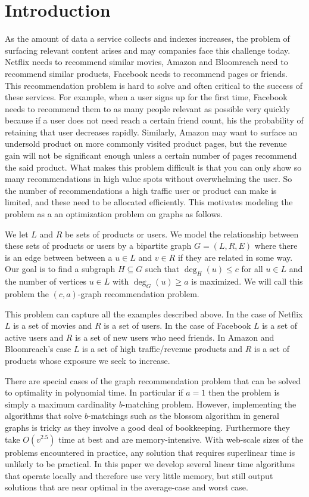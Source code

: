 \section{Introduction}
As the amount of data a service collects and indexes increases, the
problem of surfacing relevant content arises and may companies face
this challenge today. Netflix needs to recommend similar movies,
Amazon and Bloomreach need to recommend similar products, Facebook
needs to recommend pages or friends. This recommendation problem is
hard to solve and often critical to the success of these services. For
example, when a user signs up for the first time, Facebook needs to
recommend them to as many people relevant as possible very quickly
because if a user does not need reach a certain friend count, his the
probability of retaining that user decreases rapidly. Similarly,
Amazon may want to surface an undersold product on more commonly
visited product pages, but the revenue gain will not be significant
enough unless a certain number of pages recommend the said
product. What makes this problem difficult is that you can only show
so many recommendations in high value spots without overwhelming the
user. So the number of recommendations a high traffic user or product
can make is limited, and these need to be allocated efficiently. This
motivates modeling the problem as a an optimization problem on graphs
as follows. \vs

We let $L$ and $R$ be sets of products or users. We model the
relationship between these sets of products or users by a bipartite
graph $G=(L,R,E)$ where there is an edge between between a $u\in L$
and $v\in R$ if they are related in some way. Our goal is to find
a subgraph $H\subseteq G$ such that $\deg_{H}(u) \leq c$ for all $u\in
L$ and the number of vertices $u\in L$ with $\deg_{G}(u) \geq
a$ is maximized. We will call this problem the $(c,a)$-graph
recommendation problem.\vs

This problem can capture all the examples described above. In the case
of Netflix $L$ is a set of movies and $R$ is a set of users. In the
case of Facebook $L$ is a set of active users and $R$ is a set of new
users who need friends. In Amazon and Bloomreach's case $L$ is a set
of high traffic/revenue products and $R$ is a set of products whose
exposure we seek to increase. \vs

There are special cases of the graph recommendation problem that can
be solved to optimality in polynomial time. In particular if $a=1$
then the problem is simply a maximum cardinality $b$-matching
problem. However, implementing the algorithms that solve $b$-matchings
such as the blossom algorithm in general graphs is tricky as they
involve a good deal of bookkeeping. Furthermore they take $O(v^{2.5})$
time at best and are memory-intensive. With web-scale sizes of the
problems encountered in practice, any solution that requires
superlinear time is unlikely to be practical. In this paper we
develop several linear time algorithms that operate locally and
therefore use very little memory, but still output solutions
that are near optimal in the average-case and worst case.